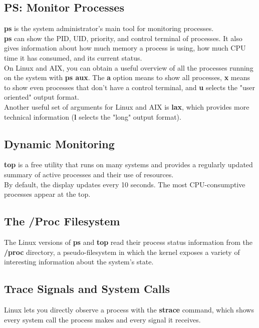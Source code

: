 \documentclass[10pt,letterpaper]{book}
\begin{document}
\subsection{PS: Monitor Processes}
\textbf{ps} is the system administrator's main tool for monitoring processes.\\
\textbf{ps} can show the PID, UID, priority, and control terminal of processes. It also gives information about how much memory a process is using, how much CPU time it has consumed, and its current status.\\
On Linux and AIX, you can obtain a useful overview of all the processes running on the system with \textbf{ps aux}. The \textbf{a} option means to show all processes, \textbf{x} means to show even processes that don't have a control terminal, and \textbf{u} selects the "user oriented" output format.\\
Another useful set of arguments for Linux and AIX is \textbf{lax}, which provides more technical information (\textbf{l} selects the "long" output format).
\subsection{Dynamic Monitoring}
\textbf{top} is a free utility that runs on many systems and provides a regularly updated summary of active processes and their use of resources.\\
By default, the display updates every 10 seconds. The most CPU-consumptive processes appear at the top.
\subsection{The /Proc Filesystem}
The Linux versions of \textbf{ps} and \textbf{top} read their process status information from the \textbf{/proc} directory, a pseudo-filesystem in which the kernel exposes a variety of interesting information about the system's state.
\subsection{Trace Signals and System Calls}
Linux lets you directly observe a process with the \textbf{strace} command, which shows every system call the process makes and every signal it receives.
\end{document}
